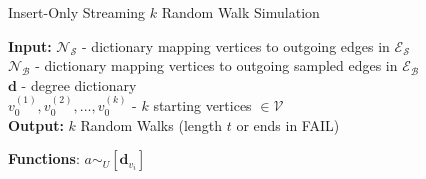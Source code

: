 \documentclass{report}
\newcommand{\algoname}[1]{\textnormal{\textsc{#1}}}
\begin{document}
\begin{algorithm}[htbp] 
\caption{Insert-Only Streaming $k$ Random Walk Simulation}\label{alg:rw:serial:insert-only:simulation}
\begin{flushleft}
        \textbf{Input:} 		$\mathcal{N}_\mathcal{S}$ - dictionary mapping vertices to outgoing edges in $\mathcal{E}_\mathcal{S}$ \\
        	\hspace{3.15em}	$\mathcal{N}_\mathcal{B}$ - dictionary mapping vertices to outgoing sampled edges in $\mathcal{E}_\mathcal{B}$ \\
        	\hspace{3.15em}	$\mathbf{d}$ - degree dictionary \\
        	\hspace{3.15em}	$v_0^{(1)}, v_0^{(2)}, \dots, v_0^{(k)}$ - $k$ starting vertices $\in \mathcal{V}$ \\
        \textbf{Output:} $k$ Random Walks (length $t$ or ends in FAIL)
\end{flushleft}
\begin{flushleft}
\begin{algorithmic}[1]
	\Statex \textbf{Functions}:
				\State $a \sim_U [\mathbf{d}_{v_i}] $

\end{algorithmic}
\end{flushleft}
\end{algorithm}
\end{document}
